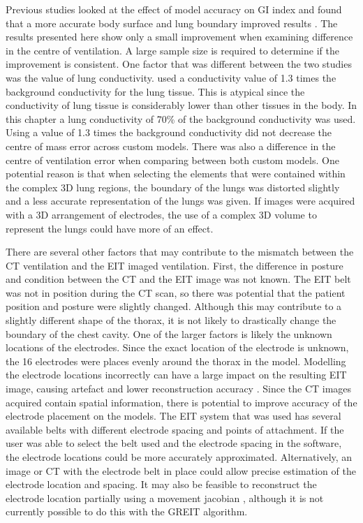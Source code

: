 Previous studies looked at the effect of model accuracy on GI index and found that a more 
accurate body surface and lung boundary improved results \parencite{yang_lung_2021}. 
The results presented here show only a small improvement when examining difference in  the centre
of ventilation. A large sample size is required to determine if the improvement is consistent.
One factor that was different between the two studies was the value 
of lung conductivity.  used a conductivity value of 1.3 times the background conductivity for the lung 
tissue. This is atypical since the conductivity of lung tissue is 
considerably lower than other tissues in the body. 
In this chapter a lung conductivity of 70\% of the 
background conductivity was
used. Using a value of 
1.3 times the background 
conductivity did not decrease the centre of mass error across custom models.
There was also a difference in the centre of ventilation error when comparing 
between both custom models. One potential reason is that when selecting the elements that were
contained within the complex 3D lung regions, the boundary of the lungs was distorted slightly and a less accurate
representation of the lungs was given. 
If images were acquired with a 3D arrangement of electrodes, the use of a complex 3D volume to represent the lungs 
could have more of an effect.

There are several other factors that may contribute to the mismatch between the 
CT ventilation and the EIT imaged ventilation. 
First, the difference in posture and condition between the CT and the EIT image 
was not known. The EIT belt was not in position during the CT scan, so  there was potential that the
patient position and posture were slightly changed. Although this may contribute to a slightly different
shape of the thorax, it is not likely to drastically change the boundary of the chest cavity. 
One of the larger factors is likely the unknown locations of the electrodes. Since the exact location 
of the electrode is unknown, the 16 electrodes were  places evenly around the thorax in the model. 
Modelling the electrode locations incorrectly can have a large impact on the resulting EIT
image, causing artefact and lower reconstruction accuracy \parencite{boyle_impact_2011}.
Since the CT images acquired 
contain spatial information, there is potential to improve accuracy of the 
electrode placement on the models. The EIT system that was used has several available belts with 
different electrode spacing and points of attachment. If the user was able to select 
the belt used and the electrode spacing in the software, 
the electrode locations could be more accurately
approximated. Alternatively, an image or CT with the electrode belt in place could allow
precise estimation of the electrode location and spacing. It may also 
be feasible to reconstruct the electrode location partially using a movement jacobian 
\parencite{soleimani_imaging_2006}, although it is not currently possible to do this 
with the GREIT algorithm. 

